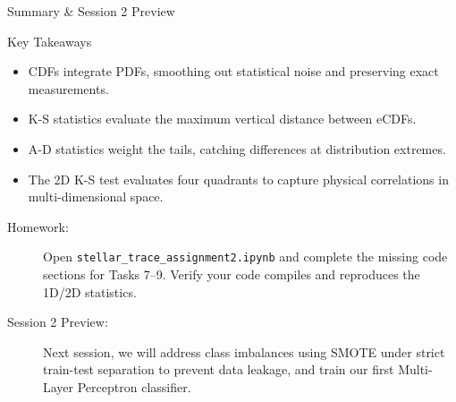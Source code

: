 \documentclass[9pt]{beamer}
\begin{document}
\begin{frame}{Summary \& Session 2 Preview}
  \begin{block}{Key Takeaways}
    \begin{itemize}
      \item CDFs integrate PDFs, smoothing out statistical noise and preserving exact measurements.
      \item K-S statistics evaluate the maximum vertical distance between eCDFs.
      \item A-D statistics weight the tails, catching differences at distribution extremes.
      \item The 2D K-S test evaluates four quadrants to capture physical correlations in multi-dimensional space.
    \end{itemize}
  \end{block}
  \begin{description}
    \item[Homework:] Open \texttt{stellar\_trace\_assignment2.ipynb} and complete the missing code sections for Tasks 7--9. Verify your code compiles and reproduces the 1D/2D statistics.
    \item[Session 2 Preview:] Next session, we will address class imbalances using SMOTE under strict train-test separation to prevent data leakage, and train our first Multi-Layer Perceptron classifier.
  \end{description}
\end{frame}
\end{document}
